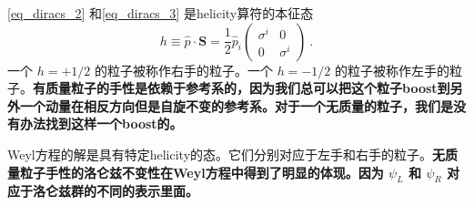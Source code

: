 \autoref{eq_diracs_2} 和\autoref{eq_diracs_3} 是helicity算符的本征态
\begin{equation}
h\equiv\hat p \cdot \mathbf S = \frac{1}{2} \hat p_i \begin{pmatrix}
\sigma^i & 0 \\
 0 & \sigma^i
\end{pmatrix}~.
\end{equation}
一个 $h=+1/2$ 的粒子被称作右手的粒子。一个 $h=-1/2$ 的粒子被称作左手的粒子。\textbf{有质量粒子的手性是依赖于参考系的，因为我们总可以把这个粒子boost到另外一个动量在相反方向但是自旋不变的参考系。对于一个无质量的粒子，我们是没有办法找到这样一个boost的。}

Weyl方程的解是具有特定helicity的态。它们分别对应于左手和右手的粒子。\textbf{无质量粒子手性的洛仑兹不变性在Weyl方程中得到了明显的体现。因为 $\psi_L$ 和 $\psi_R$ 对应于洛仑兹群的不同的表示里面。}


